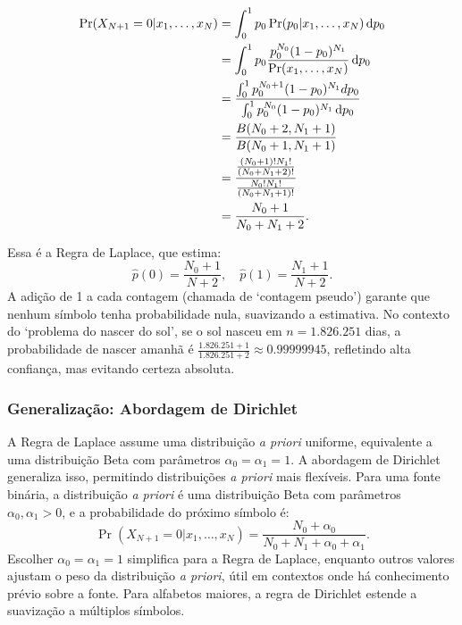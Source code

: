 \begin{subequations}
  \begin{align}
    \Pr(X_{N+1} = 0 | x_1, \ldots, x_N) &= \int_0^1 p_0 \Pr(p_0 | x_1, \ldots, x_N) \mathop{}\!\mathrm{d} p_0 \\
                                        &= \int_0^1 p_0 \frac{p_0^{N_0} (1 - p_0)^{N_1}}{\Pr(x_1, \ldots, x_N)} \mathop{}\!\mathrm{d} p_0 \\
                                        &= \frac{\int_0^1 p_0^{N_0 + 1} (1 - p_0)^{N_1} dp_0}{\int_0^1 p_0^{N_0} (1 - p_0)^{N_1} \mathop{}\!\mathrm{d} p_0} \\
                                        &= \frac{B(N_0 + 2, N_1 + 1)}{B(N_0 + 1, N_1 + 1)} \\
                                        &= \frac{\frac{(N_0 + 1)! N_1!}{(N_0 + N_1 + 2)!}}{\frac{ N_0! N_1! }{ (N_0 + N_1 +1)!  }} \\
                                        &= \frac{N_0 + 1}{N_0 + N_1 + 2}.
  \end{align}
\end{subequations}

Essa é a Regra de Laplace, que estima:
\begin{equation}
\hat{p}(0) = \frac{N_0 + 1}{N + 2}, \quad \hat{p}(1) = \frac{N_1 + 1}{N + 2}.
\end{equation}
A adição de 1 a cada contagem (chamada de `contagem pseudo') garante que nenhum 
símbolo tenha probabilidade nula, suavizando a estimativa. No contexto do `problema do nascer do sol', 
se o sol nasceu em $n = 1.826.251$ dias, a probabilidade de nascer amanhã é $\frac{1.826.251 + 1}{1.826.251 + 2} \approx 0.99999945$, 
refletindo alta confiança, mas evitando certeza absoluta.






\subsubsection{Generalização: Abordagem de Dirichlet}

A Regra de Laplace assume uma distribuição \textit{a priori} uniforme, equivalente a uma distribuição
Beta com parâmetros $\alpha_0 = \alpha_1 = 1$. A abordagem de Dirichlet
generaliza isso, permitindo distribuições \textit{a priori} mais flexíveis. Para uma fonte binária, a
distribuição \textit{a priori} é uma distribuição Beta com parâmetros $\alpha_0, \alpha_1 > 0$, e a
probabilidade do próximo símbolo é:
\begin{equation}
\Pr(X_{N+1} = 0 | x_1, \ldots, x_N) = \frac{N_0 + \alpha_0}{N_0 + N_1 + \alpha_0 + \alpha_1}.
\end{equation}
Escolher $\alpha_0 = \alpha_1 = 1$ simplifica para a Regra de Laplace, enquanto
outros valores ajustam o peso da distribuição \textit{a priori}, útil em contextos onde há conhecimento prévio sobre a fonte. 
Para alfabetos maiores, a regra de Dirichlet estende a suavização a múltiplos símbolos.





